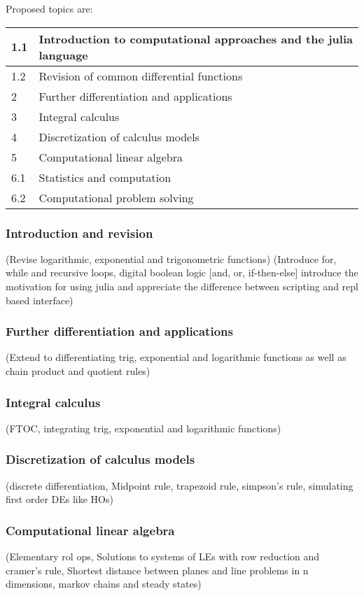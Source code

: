 \documentclass[12pt]{report}
\begin{document}
    Proposed topics are:
    \begin{table}[H]
        \centering
        \begin{tabular}{|l|l|}
        \hline
            1.1 & Introduction to computational approaches and the julia language\\ \hline
            1.2 & Revision of common differential functions\\ \hline
            2 & Further differentiation and applications \\ \hline
            3 & Integral calculus \\ \hline
            4 & Discretization of calculus models\\ \hline
            5 & Computational linear algebra \\ \hline
            6.1 & Statistics and computation \\ \hline
            6.2 & Computational problem solving \\ \hline
        \end{tabular}
    \end{table}

    \subsubsection{Introduction and revision} (Revise logarithmic, exponential and trigonometric functions) (Introduce for, while and recursive loops, digital boolean logic [and, or, if-then-else] introduce the motivation for using julia and appreciate the difference between scripting and repl based interface)
    \subsubsection{Further differentiation and applications} (Extend to differentiating trig, exponential and logarithmic functions as well as chain product and quotient rules)
    \subsubsection{Integral calculus} (FTOC, integrating trig, exponential and logarithmic functions)
    \subsubsection{Discretization of calculus models} (discrete differentiation, Midpoint rule, trapezoid rule, simpson's rule, simulating first order DEs like HOs)
    \subsubsection{Computational linear algebra} (Elementary rol ops, Solutions to systems of LEs with row reduction and cramer's rule, Shortest distance between planes and line problems in n dimensions, markov chains and steady states)
\end{document}
